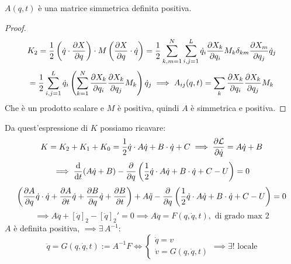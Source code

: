 \begin{remark}
    $A(q,t)$ è una matrice simmetrica definita positiva.
\end{remark}
\begin{proof}
    \begin{equation*}
        K_2 = \frac{1}{2}\left( \dot{q} \cdot \pdv{X}{q} \right) \cdot M \left( \pdv{X}{q} \cdot \dot{q} \right)
        = \frac{1}{2} \sum_{k,m=1}^{N} \sum_{i,j=1}^{L} \dot{q}_i \pdv{X_k}{q_i} M_k \delta_{km} \pdv{X_m}{q_j} \dot{q}_j
    \end{equation*}
    \begin{equation}
        = \frac{1}{2} \sum_{i,j=1}^{L} \dot{q}_i \left( \sum_{k=1}^{N} \pdv{X_k}{q_i} \pdv{X_k}{q_j} M_k \right) \dot{q}_j
        \implies A_{ij}(q,t) = \sum_k \pdv{X_k}{q_i} \pdv{X_k}{q_j} M_k
    \end{equation}
    Che è un prodotto scalare e $M$ è positiva, quindi $A$ è simmetrica e positiva.
\end{proof}

Da quest'espressione di $K$ possiamo ricavare:
\begin{equation}
    K = K_2 + K_1 + K_0 = \frac{1}{2} \dot{q} \cdot A \dot{q} + B \cdot \dot{q} + C
    \implies \pdv{\mathcal{L}}{\dot{q}} = A \dot{q} + B
\end{equation}
\begin{equation}
    \implies \dv{t}(A \dot{q} + B) - \pdv{}{q} \left( \frac{1}{2} \dot{q} \cdot A \dot{q} + B \cdot \dot{q} + C - U \right) = 0
\end{equation}
\begin{equation*}
    \left( \pdv{A}{q} \dot{q} \cdot \dot{q} + \pdv{A}{t} \dot{q} + \pdv{B}{q} \dot{q} + \pdv{B}{t} \right)
    + A \ddot{q} - \pdv{}{q} \left( \frac{1}{2} \dot{q} \cdot A \dot{q} + B \cdot \dot{q} + C - U \right) = 0
\end{equation*}
\begin{equation}
    \implies A \ddot{q} + \left[ \dot{q} \right]_2 - \left[ \dot{q} \right]_2' = 0
    \implies A \ddot{q} = F(q, \dot{q}, t), \text{ di grado max } 2
\end{equation}
$A$ è definita positiva, $\implies \exists\,A^{-1}$:
\begin{equation}
    \ddot{q}= G(q,\dot{q},t):= A^{-1}F \iff 
    \begin{cases}
        \dot{q}= v\\\dot{v}= G(q,\dot{q},t)
    \end{cases}\implies \exists! \text{ locale}
\end{equation}

